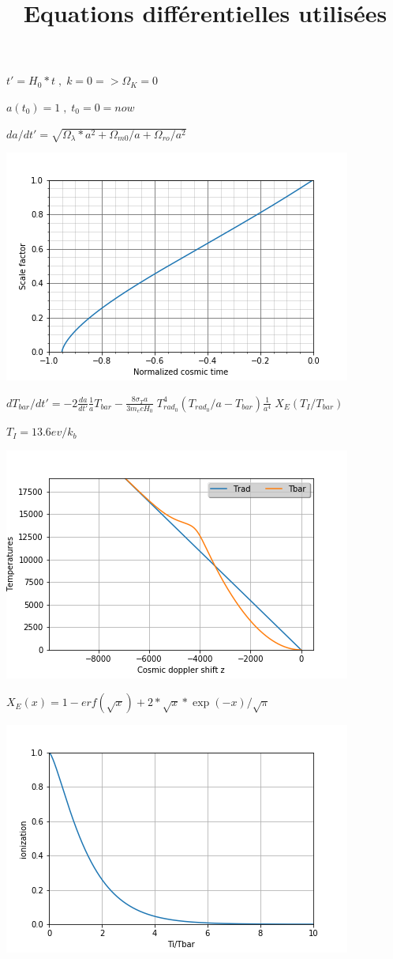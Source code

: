 \documentclass[12pt, a4paper]{article}
\date{}
\begin{document}
\title{Equations différentielles utilisées}
\maketitle

\smallskip

\Large $t' = H_0*t \;,\; k=0 => \Omega_K=0$

$ a(t_0)=1 \;,\; t_0 = 0 = now$ 

\medskip

$da/dt' = \sqrt{\Omega_{\lambda}*a^2+\Omega_{m0}/a+\Omega_{ro}/a^2}$

\includegraphics{Scale_factor}

\bigskip

$dT_{bar}/dt' = -2 \frac{da}{dt'}\frac{1}{a} T_{bar}-\frac{8\sigma_Ta}{3m_ecH_0}\; T_{rad_0}^4 (T_{rad_0}/a-T_{bar})\frac{1}{a^4} \; X_E(T_I/T_{bar})$

\medskip

$T_I = 13.6ev/k_b$


\includegraphics{Temperatures}


$X_E(x)=1-erf(\sqrt{x})+2*\sqrt{x}*\exp(-x)/\sqrt{\pi}$


\includegraphics{XE}
\end{document}
